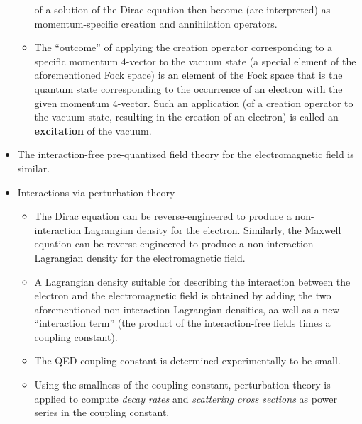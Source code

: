 \begin{itemize}
\begin{itemize}
		of a solution of the Dirac equation then become (are interpreted)
		as momentum-specific creation and annihilation operators.
	\item
		The ``outcome'' of applying the creation operator corresponding to a specific momentum $4$-vector
		to the vacuum state (a special element of the aforementioned Fock space)
		is an element of the Fock space that is the quantum state corresponding to the occurrence of an electron
		with the given momentum $4$-vector.
		Such an application (of a creation operator to the vacuum state, resulting in the creation of an electron)
		is called an \textbf{excitation} of the vacuum. 
	\end{itemize}
\item
	The interaction-free pre-quantized field theory for the electromagnetic field is similar.
\item
	Interactions via perturbation theory
	\begin{itemize}
	\item
		The Dirac equation can be reverse-engineered to produce a non-interaction Lagrangian density for the electron.
		Similarly, the Maxwell equation can be reverse-engineered to produce a non-interaction Lagrangian density for the electromagnetic field.
	\item
		A Lagrangian density suitable for describing the interaction between the electron and the electromagnetic field
		is obtained by adding the two aforementioned non-interaction Lagrangian densities, aa well as
		a new ``interaction term'' (the product of the interaction-free fields times a coupling constant).
	\item
		The QED coupling constant is determined experimentally to be small.
	\item
		Using the smallness of the coupling constant, perturbation theory is applied to compute
		\textit{decay rates} and \textit{scattering cross sections}
		as power series in the coupling constant.
	\end{itemize}
\end{itemize}


